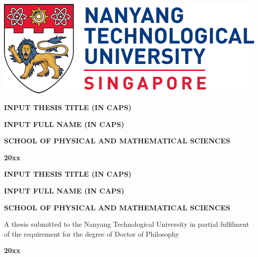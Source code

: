 \begin{center}
	\includegraphics[width=\textwidth]{img/ntu_logo.png}

	\vfill

	{\huge \bfseries INPUT THESIS TITLE (IN CAPS)}

	\vfill

	{\Large \bfseries INPUT FULL NAME (IN CAPS)}

	\vfill

	{\bfseries SCHOOL OF PHYSICAL AND MATHEMATICAL SCIENCES}

	\vfill

	{\bfseries 20xx}

	\newpage

	{\huge \bfseries INPUT THESIS TITLE (IN CAPS)}

	\vfill

	{\Large \bfseries INPUT FULL NAME (IN CAPS)}

	\vfill

	{\bfseries SCHOOL OF PHYSICAL AND MATHEMATICAL SCIENCES}

	\vfill

	{\large A thesis submitted to the Nanyang Technological University in partial fulfilment of the requirement for the degree of Doctor of Philosophy}

	\vfill

	{\bfseries 20xx}
\end{center}